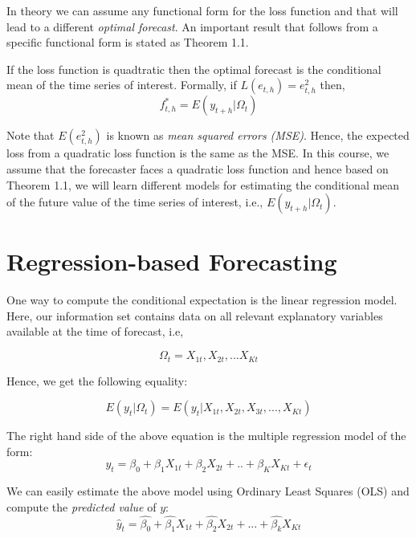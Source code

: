 \documentclass[]{book}
\theoremstyle{definition}
\theoremstyle{definition}
\theoremstyle{definition}
\theoremstyle{remark}
\let\BeginKnitrBlock\begin \let\EndKnitrBlock\end
\begin{document}
In theory we can assume any functional form for the loss function and
that will lead to a different \emph{optimal forecast}. An important
result that follows from a specific functional form is stated as Theorem
1.1.

\BeginKnitrBlock{theorem}
\protect\hypertarget{thm:unnamed-chunk-2}{}{\label{thm:unnamed-chunk-2} }If
the loss function is quadtratic then the optimal forecast is the
conditional mean of the time series of interest. Formally, if
\(L(e_{t,h})=e_{t,h}^2\) then, \begin{equation}
f^*_{t,h}=E(y_{t+h}|\Omega_t)
\end{equation}
\EndKnitrBlock{theorem}

Note that \(E(e_{t,h}^2)\) is known as \emph{mean squared errors (MSE)}.
Hence, the expected loss from a quadratic loss function is the same as
the MSE. In this course, we assume that the forecaster faces a quadratic
loss function and hence based on Theorem 1.1, we will learn different
models for estimating the conditional mean of the future value of the
time series of interest, i.e., \(E(y_{t+h}|\Omega_t)\).

\hypertarget{regression-based-forecasting}{%
\chapter{Regression-based
Forecasting}\label{regression-based-forecasting}}

One way to compute the conditional expectation is the linear regression
model. Here, our information set contains data on all relevant
explanatory variables available at the time of forecast, i.e,

\begin{equation}
\Omega_t={X_{1t}, X_{2t},...X_{Kt}}
\end{equation}

Hence, we get the following equality:

\begin{equation}
E(y_t|\Omega_t)=E(y_{t}|X_{1t}, X_{2t}, X_{3t},...,X_{Kt})
\end{equation}

The right hand side of the above equation is the multiple regression
model of the form: \begin{equation}
 y_{t}=\beta_0+\beta_1 X_{1t}+\beta_2 X_{2t}+..+\beta_K X_{Kt}+\epsilon_t
 \end{equation}

We can easily estimate the above model using Ordinary Least Squares
(OLS) and compute the \emph{predicted value} of \(y\): \begin{equation}
    \widehat{y}_t = \widehat{\beta_0} +\widehat{\beta_1} X_{1t} +\widehat{\beta_2} X_{2t}+...+ \widehat{\beta_k} X_{Kt}
  \end{equation}
\end{document}
